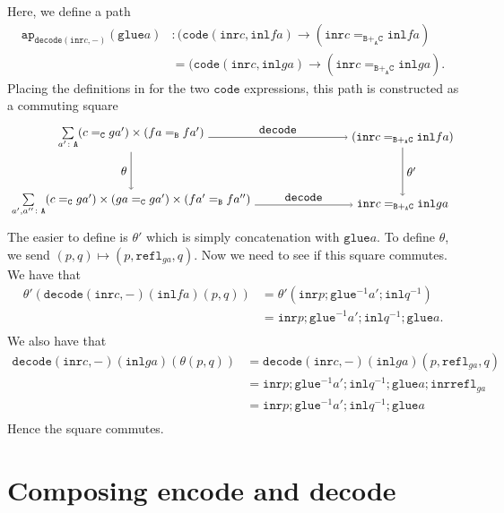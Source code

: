\message{ !name(notes.tex)}\documentclass[12pt]{amsart}
\newcommand{\inv}{^{-1}}
\newcommand{\type}[1]{\mathtt{#1}}
\newcommand{\tin}{\colon}
\newcommand{\A}{\type{A}}
\newcommand{\B}{\type{B}}
\newcommand{\C}{\type{C}}
\newcommand{\BAC}{\B +_{\A} \C}
\newcommand{\ap}{\type{ap}}
\newcommand{\inl}{\type{inl}}
\newcommand{\inr}{\type{inr}}
\newcommand{\glue}{\type{glue}}
\newcommand{\refl}{\type{refl}}
\newcommand{\code}{\type{code}}
\newcommand{\decode}{\type{decode}}
\theoremstyle{remark}
\theoremstyle{definition}
\begin{document}
Here, we define a path
\begin{align*}
  \ap_{\decode ( \inr c , - )} (\glue a) &
  \tin
  ( \code ( \inr c , \inl fa ) \to ( \inr c =_{\BAC} \inl fa ) \\
  & =
  ( \code ( \inr c , \inl ga ) \to ( \inr c =_{\BAC} \inl ga ).
\end{align*}
Placing the definitions in for the two \( \code \) expressions, this
path is constructed as a commuting square
\[
  \begin{tikzpicture}
    \node (1) at (-4,1) {\( \sum\limits_{a' \tin \A} ( c =_{\C} ga' )
      \times ( fa =_{\B} fa' ) \)};
    \node (2) at (-4,-1) {\( \sum\limits_{a',a'' \tin \A} ( c =_{\C}
      ga' ) \times ( ga =_{\C} ga' ) \times ( fa' =_{\B} fa'' ) \)};
    \node (3) at (4,1) {\( ( \inr c =_{\BAC} \inl fa ) \)};
    \node (4) at (4,-1) {\( \inr c =_{\BAC} \inl ga \)};
    \draw [->] (1) to node [left] {\( \theta \)} (2);
    \draw [->] (1) to node [above] {\( \decode \)} (3);
    \draw [->] (2) to node [above] {\( \decode \)} (4);
    \draw [->] (3) to node [right] {\( \theta' \)} (4); 
  \end{tikzpicture}
\]
The easier to define is \( \theta' \) which is simply concatenation
with \( \glue a \).  To define \( \theta \), we send \( ( p,q )
\mapsto ( p, \refl_{ga} , q ) \).  Now we need to see if this square
commutes. We have that
\begin{align*}
  \theta' ( \decode ( \inr c , - ) ( \inl fa ) ( p,q ) )
  & = \theta' ( \inr p ; \glue^{-1} a' ; \inl q^{-1}  ) \\
  & = \inr p ; \glue^{-1} a' ; \inl q^{-1} ; \glue a. \\
\end{align*}
We also have that
\begin{align*}
  \decode ( \inr c , - ) ( \inl ga ) ( \theta ( p,q ) )
  & = \decode ( \inr c , - ) ( \inl ga ) ( p,\refl_{ga},q ) \\
  & =  \inr p ; \glue\inv a' ; \inl q\inv ; \glue a ; \inr \refl_{ga} \\
  & =  \inr p ; \glue\inv a' ; \inl q\inv ; \glue a  \\
\end{align*}
Hence the square commutes.


\section{Composing encode and decode}
\end{document}

